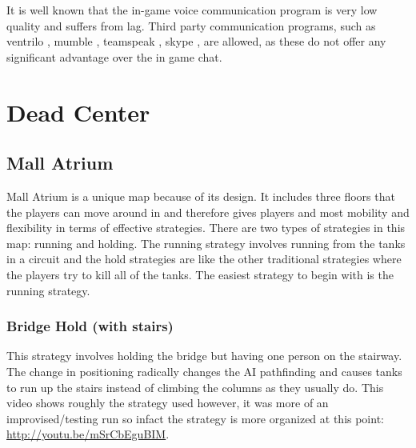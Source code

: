 It is well known that the in-game voice communication program is very low quality and suffers from lag. Third party communication programs, such as ventrilo \cite{web:ventrilo}, mumble \cite{web:mumble}, teamspeak \cite{web:teamspeak}, skype \cite{web:skype}, are allowed, as these do not offer any significant advantage over the in game chat.

\section{Dead Center}

\subsection{Mall Atrium}
Mall Atrium is a unique map because of its design. It includes three floors that the players can move around in and therefore gives players and most mobility and flexibility in terms of effective strategies. There are two types of strategies in this map: running and holding. The running strategy involves running from the tanks in a circuit and the hold strategies are like the other traditional strategies where the players try to kill all of the tanks. The easiest strategy to begin with is the running strategy.

\subsubsection{Bridge Hold (with stairs)}
This strategy involves holding the bridge but having one person on the stairway. The change in positioning radically changes the AI pathfinding and causes tanks to run up the stairs instead of climbing the columns as they usually do. This video shows roughly the strategy used however, it was more of an improvised/testing run so infact the strategy is more organized at this point: \url{http://youtu.be/mSrCbEguBIM}.

